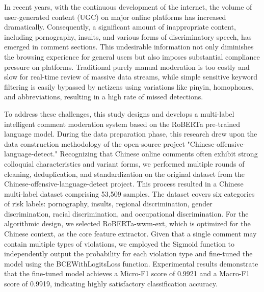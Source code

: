 \documentclass[twoside]{thesis-cls-Miya} %
\begin{document}
\begin{englishabstract}
In recent years, with the continuous development of the internet, the volume of user-generated content (UGC) on major online platforms has increased dramatically. Consequently, a significant amount of inappropriate content, including pornography, insults, and various forms of discriminatory speech, has emerged in comment sections. This undesirable information not only diminishes the browsing experience for general users but also imposes substantial compliance pressure on platforms. Traditional purely manual moderation is too costly and slow for real-time review of massive data streams, while simple sensitive keyword filtering is easily bypassed by netizens using variations like pinyin, homophones, and abbreviations, resulting in a high rate of missed detections.

To address these challenges, this study designs and develops a multi-label intelligent comment moderation system based on the RoBERTa pre-trained language model. During the data preparation phase, this research drew upon the data construction methodology of the open-source project "Chinese-offensive-language-detect." Recognizing that Chinese online comments often exhibit strong colloquial characteristics and variant forms, we performed multiple rounds of cleaning, deduplication, and standardization on the original dataset from the Chinese-offensive-language-detect project. This process resulted in a Chinese multi-label dataset comprising 53,509 samples. The dataset covers six categories of risk labels: pornography, insults, regional discrimination, gender discrimination, racial discrimination, and occupational discrimination. For the algorithmic design, we selected RoBERTa-wwm-ext, which is optimized for the Chinese context, as the core feature extractor. Given that a single comment may contain multiple types of violations, we employed the Sigmoid function to independently output the probability for each violation type and fine-tuned the model using the BCEWithLogitsLoss function. Experimental results demonstrate that the fine-tuned model achieves a Micro-F1 score of 0.9921 and a Macro-F1 score of 0.9919, indicating highly satisfactory classification accuracy.


\end{englishabstract}
\end{document}
